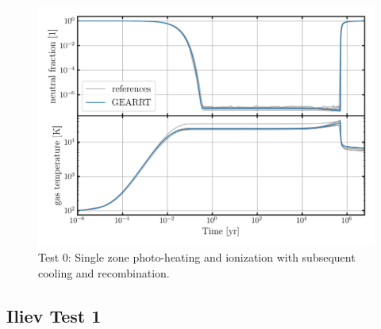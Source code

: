 \begin{figure}
 \centering
 \includegraphics[width=\textwidth]{figures/RHD/ilievTest0part3.png}
 \caption{
 Test 0: Single zone photo-heating and ionization with subsequent cooling and recombination.
 }
 \label{fig:iliev0}
\end{figure}











\subsection{Iliev Test 1}\label{chap:Iliev1}




